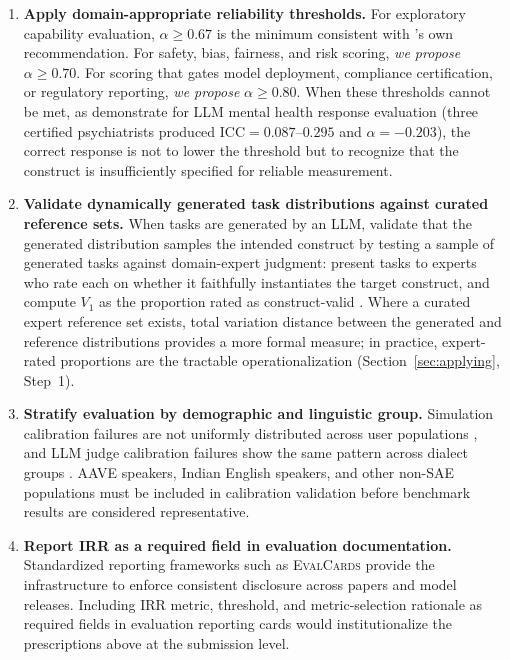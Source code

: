 \documentclass[preprint,12pt]{elsarticle}
\begin{document}
\begin{enumerate}
\item \textbf{Apply domain-appropriate reliability thresholds.}
For exploratory capability evaluation, $\alpha \geq 0.67$ is the minimum consistent
with \citet[pp.~241--243]{krippendorff2004}'s own recommendation. For safety, bias,
fairness, and risk scoring, \emph{we propose} $\alpha \geq 0.70$. For scoring that
gates model deployment, compliance certification, or regulatory reporting, \emph{we
propose} $\alpha \geq 0.80$. When these thresholds cannot be met, as \citet{jafari2026}
demonstrate for LLM mental health response evaluation (three certified psychiatrists
produced $\text{ICC} = 0.087$--$0.295$ and $\alpha = -0.203$), the correct response
is not to lower the threshold but to recognize that the construct is insufficiently
specified for reliable measurement.

\item \textbf{Validate dynamically generated task distributions against curated
reference sets.} When tasks are generated by an LLM, validate that the generated
distribution samples the intended construct by testing a sample of generated tasks
against domain-expert judgment: present tasks to experts who rate each on whether it
faithfully instantiates the target construct, and compute $V_1$ as the proportion
rated as construct-valid \citep{zhu2025}. Where a curated expert reference set
exists, total variation distance between the generated and reference distributions
provides a more formal measure; in practice, expert-rated proportions are the
tractable operationalization (Section~\ref{sec:applying}, Step~1).

\item \textbf{Stratify evaluation by demographic and linguistic group.} Simulation
calibration failures are not uniformly distributed across user populations
\citep{seshadri2026}, and LLM judge calibration failures show the same pattern across
dialect groups \citep{faisal2024}. AAVE speakers, Indian English speakers, and other
non-SAE populations must be included in calibration validation before benchmark
results are considered representative.

\item \textbf{Report IRR as a required field in evaluation documentation.}
Standardized reporting frameworks such as \textsc{EvalCards} \citep{dhar2025} provide
the infrastructure to enforce consistent disclosure across papers and model releases.
Including IRR metric, threshold, and metric-selection rationale as required fields
in evaluation reporting cards would institutionalize the prescriptions above at the
submission level.

\end{enumerate}
\end{document}
